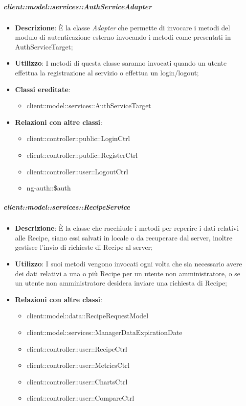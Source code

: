 		\subparagraph{client::model::services::AuthServiceAdapter} %
		\label{subp:client_model_services_authservice}
			\begin{itemize}
				\item \textbf{Descrizione}: È la classe \emph{Adapter} che permette di invocare i metodi del modulo di autenticazione esterno invocando i metodi come presentati in AuthServiceTarget;
				\item \textbf{Utilizzo}:  I metodi di questa classe saranno invocati quando un utente effettua la registrazione al servizio o effettua un login/logout;
				\item \textbf{Classi ereditate}:
					\begin{itemize}
						\item client::model::services::AuthServiceTarget
					\end{itemize}
				\item \textbf{Relazioni con altre classi}:
					\begin{itemize}
						\item client::controller::public::LoginCtrl
						\item client::controller::public::RegisterCtrl
						\item client::controller::user::LogoutCtrl
						\item ng-auth::\$auth
					\end{itemize}
			\end{itemize}


		\subparagraph{client::model::services::RecipeService} %
		\label{subp:client_model_services_recipeservice}
			\begin{itemize}
				\item \textbf{Descrizione}: È la classe che racchiude i metodi per reperire i dati relativi alle Recipe, siano essi salvati in locale o da recuperare dal server, inoltre gestisce l'invio di richieste di Recipe al server;
				\item \textbf{Utilizzo}: I suoi metodi vengono invocati ogni volta che sia necessario avere dei dati relativi a una o più Recipe per un utente non amministratore, o se un utente non amministratore desidera inviare una richiesta di Recipe;
				\item \textbf{Relazioni con altre classi}:
					\begin{itemize}
						\item client::model::data::RecipeRequestModel
						\item client::model::services::ManagerDataExpirationDate
						\item client::controller::user::RecipeCtrl
						\item client::controller::user::MetricsCtrl
						\item client::controller::user::ChartsCtrl
						\item client::controller::user::CompareCtrl
					\end{itemize}
			\end{itemize}

